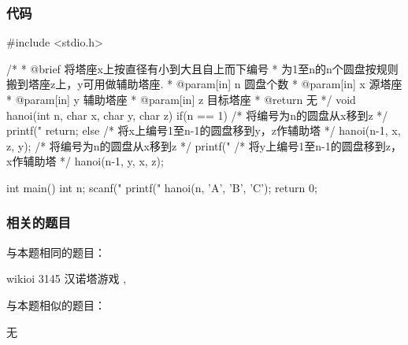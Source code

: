 \subsubsection{代码}

\begin{Codex}[label=hanoi.c]
#include <stdio.h>

/*
 * @brief 将塔座x上按直径有小到大且自上而下编号
 * 为1至n的n个圆盘按规则搬到塔座z上，y可用做辅助塔座.
 * @param[in] n 圆盘个数
 * @param[in] x 源塔座
 * @param[in] y 辅助塔座
 * @param[in] z 目标塔座
 * @return 无
 */
void hanoi(int n, char x, char y, char z) {
    if(n ==  1) {
        /* 将编号为n的圆盘从x移到z */
        printf("%
        return;
    } else {
        /* 将x上编号1至n-1的圆盘移到y，z作辅助塔 */
        hanoi(n-1, x, z, y);
        /* 将编号为n的圆盘从x移到z */
        printf("%
        /* 将y上编号1至n-1的圆盘移到z，x作辅助塔 */
        hanoi(n-1, y, x, z);
    }
}

int main() {
    int n;
    scanf("%
    printf("%
    hanoi(n, 'A', 'B', 'C');
    return 0;
}
\end{Codex}


\subsubsection{相关的题目}
与本题相同的题目：
\begindot
\item wikioi 3145 汉诺塔游戏 , 
\myenddot

与本题相似的题目：
\begindot
\item  无
\myenddot


